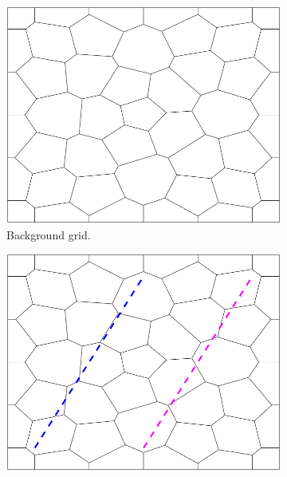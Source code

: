 \begin{figure}[htp]
    \centering
    \begin{subfigure}[b]{0.32\textwidth}
        \centering
        \includegraphics[width=\textwidth]{report/Images/Combining software/Constraints in MATLAB/constraints_MATLAB_1.png}
        \caption{Background grid.}
        \label{fig:MATLAB-constraints-1}
    \end{subfigure}
    \begin{subfigure}[b]{0.32\textwidth}
        \centering
        \includegraphics[width=\textwidth]{report/Images/Combining software/Constraints in MATLAB/constraints_MATLAB_2.png}

\end{subfigure}
\end{figure}
